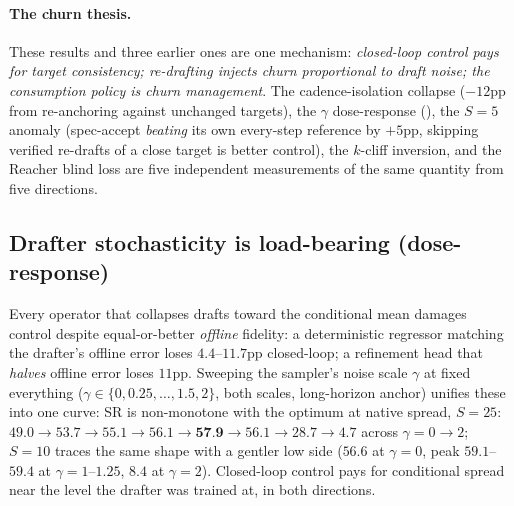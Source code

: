 \documentclass{article}
\newcommand{\ours}[1]{\textbf{#1}}
\begin{document}
\paragraph{The churn thesis.} These results and three earlier ones are one
mechanism: \emph{closed-loop control pays for target consistency; re-drafting
injects churn proportional to draft noise; the consumption policy is churn
management}. The cadence-isolation collapse ($-12$pp from re-anchoring against
unchanged targets), the $\gamma$ dose-response (), the $S{=}5$
anomaly (spec-accept \emph{beating} its own every-step reference by $+5$pp, skipping verified re-drafts of a close target is better control), the $k$-cliff
inversion, and the Reacher blind loss are five independent measurements of the same
quantity from five directions.

\subsection{Drafter stochasticity is load-bearing (dose-response)}
\label{sec:why-spread}
Every operator that collapses drafts toward the conditional mean damages control
despite equal-or-better \emph{offline} fidelity: a deterministic regressor matching
the drafter's offline error loses $4.4$--$11.7$pp closed-loop; a refinement head that
\emph{halves} offline error loses $11$pp. Sweeping the sampler's noise scale $\gamma$
at fixed everything ($\gamma\in\{0,0.25,\ldots,1.5,2\}$, both scales, long-horizon
anchor) unifies these into one curve: SR is non-monotone with the optimum at native
spread, $S{=}25$: $49.0\to53.7\to55.1\to56.1\to\ours{57.9}\to56.1\to28.7\to4.7$
across $\gamma{=}0\to2$; $S{=}10$ traces the same shape with a gentler low side
($56.6$ at $\gamma{=}0$, peak $59.1$--$59.4$ at $\gamma{=}1$--$1.25$, $8.4$ at
$\gamma{=}2$). Closed-loop control pays for conditional spread near the level the
drafter was trained at, in both directions.
\end{document}
